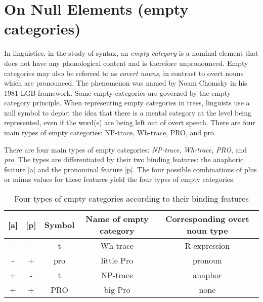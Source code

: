 \section{On Null Elements (empty categories)}
\label{sec:null-elements-gbt}
In linguistics, in the study of syntax, an \textit{empty category} is a nominal element that does not have any phonological content and is therefore unpronounced. Empty categories may also be referred to as \textit{covert nouns}, in contrast to overt nouns which are pronounced. The phenomenon was named by Noam Chomsky in his 1981 LGB framework. Some empty categories are governed by the empty category principle. When representing empty categories in trees, linguists use a null symbol to depict the idea that there is a mental category at the level being represented, even if the word(s) are being left out of overt speech. There are four main types of empty categories: NP-trace, Wh-trace, PRO, and pro.

There are four main types of empty categories: \textit{NP-trace}, \textit{Wh-trace}, \textit{PRO}, and \textit{pro}. The types are differentiated by their two binding features: the anaphoric feature [a] and the pronominal feature [p]. The four possible combinations of plus or minus values for these features yield the four types of empty categories.

\begin{table}[!ht]
	\centering
		\begin{tabular}{|c|c|c|c|c|}
			\hline
			\textbf{{[}a{]}} & \textbf{{[}p{]}} & \textbf{Symbol} & \textbf{Name of empty category} & \textbf{Corresponding overt noun type} \\ \hline
			-                & -                & t               & Wh-trace                        & R-expression                           \\ \hline
			-                & +                & pro             & little Pro                      & pronoun                                \\ \hline
			+                & -                & t               & NP-trace                        & anaphor                                \\ \hline
			+                & +                & PRO             & big Pro                         & none                                   \\ \hline
		\end{tabular}%
	\caption{Four types of empty categories according to their binding features}
	\label{tab:null-types}
\end{table}

